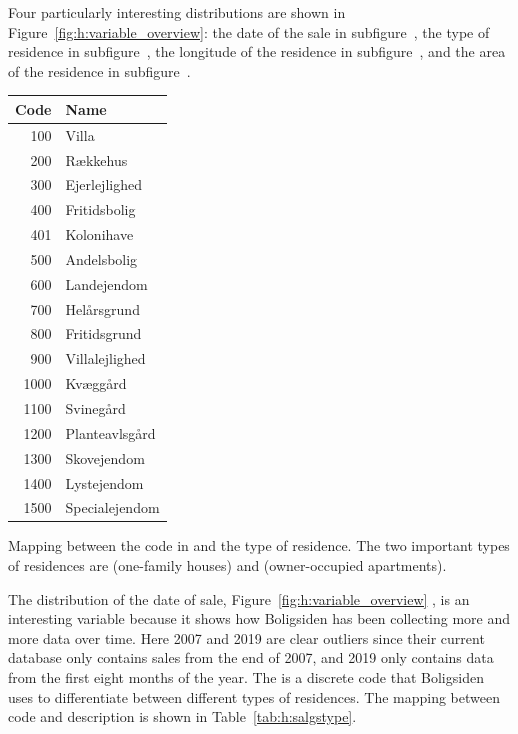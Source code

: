Four particularly interesting distributions are shown in Figure~\ref{fig:h:variable_overview}: the date of the sale  in subfigure~, the type of residence  in subfigure~,
the longitude of the residence  in subfigure~, and the area of the residence  in subfigure~.

\begin{margintable}[0.5cm]
  \centering
  \begin{tabular}{@{}rl@{}}
  Code & Name           \\ 
  \midrule
  100  & Villa          \\ 
  200  & Rækkehus       \\
  300  & Ejerlejlighed  \\
  400  & Fritidsbolig   \\
  401  & Kolonihave     \\
  500  & Andelsbolig    \\
  600  & Landejendom    \\
  700  & Helårsgrund    \\
  800  & Fritidsgrund   \\
  900  & Villalejlighed \\
  1000 & Kvæggård       \\
  1100 & Svinegård      \\
  1200 & Planteavlsgård \\
  1300 & Skovejendom    \\
  1400 & Lystejendom    \\
  1500 & Specialejendom \\ 
  \end{tabular}
  \vspace{2mm}
  \caption[Mapping between the Code in  and the Type of Residence]{Mapping between the code in  and the type of residence. The two important types of residences are  (one-family houses) and  (owner-occupied apartments).}
  \label{tab:h:salgstype}
\end{margintable}

The distribution of the date of sale, Figure~\ref{fig:h:variable_overview} , is an interesting variable because it shows how Boligsiden has been collecting more and more data over time. Here \num{2007} and \num{2019} are clear outliers since their current database only contains sales from the end of \num{2007}, and \num{2019} only contains data from the first eight months of the year. The  is a discrete code that Boligsiden uses to differentiate between different types of residences. The mapping between code and description is shown in Table~\ref{tab:h:salgstype}. 

